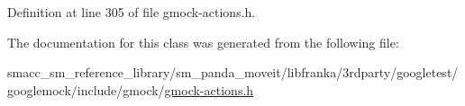 Definition at line 305 of file gmock-\/actions.\+h.



The documentation for this class was generated from the following file\+:\begin{DoxyCompactItemize}
\item 
smacc\+\_\+sm\+\_\+reference\+\_\+library/sm\+\_\+panda\+\_\+moveit/libfranka/3rdparty/googletest/googlemock/include/gmock/\hyperlink{gmock-actions_8h}{gmock-\/actions.\+h}\end{DoxyCompactItemize}
